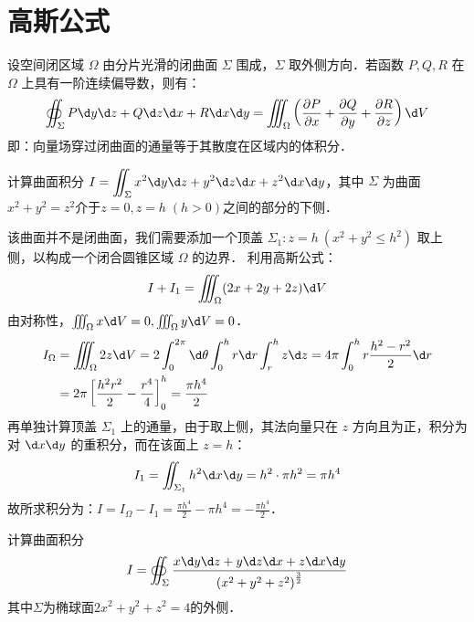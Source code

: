 \documentclass[12pt, a4paper, oneside, UTF8]{ctexbook}
\begin{document}
\section{高斯公式}
\begin{theorem}
    设空间闭区域 $\Omega$ 由分片光滑的闭曲面 $\Sigma$ 围成，$\Sigma$ 取外侧方向．若函数 $P, Q, R$ 在 $\Omega$ 上具有一阶连续偏导数，则有：
    \[ \oiint_\Sigma P \d y \d z + Q \d z \d x + R \d x \d y = \iiint_\Omega \left( \frac{\partial P}{\partial x} + \frac{\partial Q}{\partial y} + \frac{\partial R}{\partial z} \right) \d V \]
    即：向量场穿过闭曲面的通量等于其散度在区域内的体积分．
\end{theorem}

\begin{example}
    计算曲面积分 $I = \displaystyle\iint_\Sigma x^2 \d y \d z + y^2 \d z \d x + z^2 \d x \d y$，其中 $\Sigma$ 为曲面 $x^2+y^2=z^2$介于$z=0,z=h\;(h>0)$之间的部分的下侧．
\end{example}
\begin{solution}
    该曲面并不是闭曲面，我们需要添加一个顶盖 $\Sigma_1: z=h\ (x^2+y^2 \le h^2)$ 取上侧，以构成一个闭合圆锥区域 $\Omega$ 的边界．
    利用高斯公式：
    \[ I + I_1 = \iiint_\Omega (2x + 2y + 2z) \d V \]
    由对称性，$\iiint_\Omega x \d V = 0, \iiint_\Omega y \d V = 0$．
    \begin{align*}
        I_{\Omega} &= \iiint_\Omega 2z \d V = 2 \int_0^{2\pi} \d\theta \int_0^h r \d r \int_r^h z \d z = 4\pi \int_0^h r \frac{h^2-r^2}{2} \d r \\
        &= 2\pi \left[ \frac{h^2r^2}{2} - \frac{r^4}{4} \right]_0^h = \frac{\pi h^4}{2}
    \end{align*}
    再单独计算顶盖 $\Sigma_1$ 上的通量，由于取上侧，其法向量只在 $z$ 方向且为正，积分为对 $\d x\d y$ 的重积分，而在该面上 $z=h$：
    \[ I_1 = \iint_{\Sigma_1} h^2 \d x \d y = h^2 \cdot \pi h^2 = \pi h^4 \]
    故所求积分为：$I = I_{\Omega} - I_1 = \frac{\pi h^4}{2} - \pi h^4 = \boxed{-\frac{\pi h^4}{2}}$．
\end{solution}
\begin{example}
    计算曲面积分\[I=\oiint_\Sigma \frac{x\d y\d z+y\d z\d x+z\d x\d y}{\left(x^2+y^2+z^2\right)^{\frac{3}{2}}}\]
    其中$\Sigma$为椭球面$2x^2+y^2+z^2=4$的外侧．
\end{example}
\end{document}
